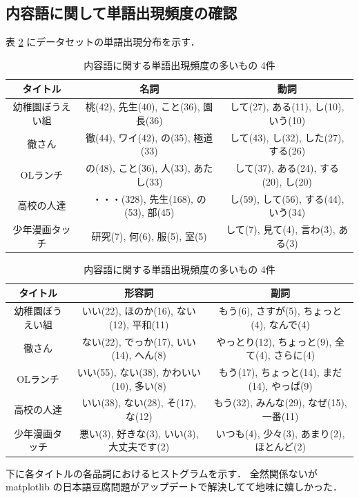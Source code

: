 \documentclass[onecolumn]{ujarticle}   %
\begin{document}
	\subsection{内容語に関して単語出現頻度の確認}
	表 \ref{tab:word_count} にデータセットの単語出現分布を示す．
	\begin{table}[h]
		\vspace{-3mm}
		\centering
		\caption{内容語に関する単語出現頻度の多いもの 4件}
		\label{tab:word_count}
		\begin{tabular}{|c|c|c|} \hline
			タイトル&名詞&動詞\\ \hline\hline
			幼稚園ぼうえい組&桃(42), 先生(40), こと(36), 園長(36)&して(27), ある(11), し(10), いう(10)\\ \hline
			徹さん&徹(44), ワイ(42), の(35), 極道(33)&して(43), し(32), した(27), する(26)\\ \hline
			OLランチ&の(48), こと(36), 人(33), あたし(33)&して(37), ある(24), する(20), し(20)\\ \hline
			高校の人達&・・・(328), 先生(168), の(53), 部(45)&し(59), して(56), する(44), いう(34)\\ \hline
			少年漫画タッチ&研究(7), 何(6), 服(5), 室(5)&して(7), 見て(4), 言わ(3), ある(3)\\ \hline
		\end{tabular}
		\begin{tabular}{|c|c|c|} \hline
			タイトル&形容詞&副詞\\ \hline\hline
			幼稚園ぼうえい組&いい(22), ほのか(16), ない(12), 平和(11)&もう(6), さすが(5), ちょっと(4), なんで(4)\\ \hline
			徹さん&ない(22), でっか(17), いい(14), へん(8)&やっとり(12), ちょっと(9), 全て(4), さらに(4)\\ \hline
			OLランチ&いい(55), ない(38), かわいい(10), 多い(8)&もう(17), ちょっと(14), まだ(14), やっぱ(9)\\ \hline
			高校の人達&いい(38), ない(28), そ(17), な(12)&もう(32), みんな(29), なぜ(15), 一番(11)\\ \hline
			少年漫画タッチ&悪い(3), 好きな(3), いい(3), 大丈夫です(2)&いつも(4), 少々(3), あまり(2), ほとんど(2)\\ \hline
		\end{tabular}
	\end{table}

	下に各タイトルの各品詞におけるヒストグラムを示す．
	全然関係ないが matplotlib の日本語豆腐問題がアップデートで解決してて地味に嬉しかった．
\end{document}
